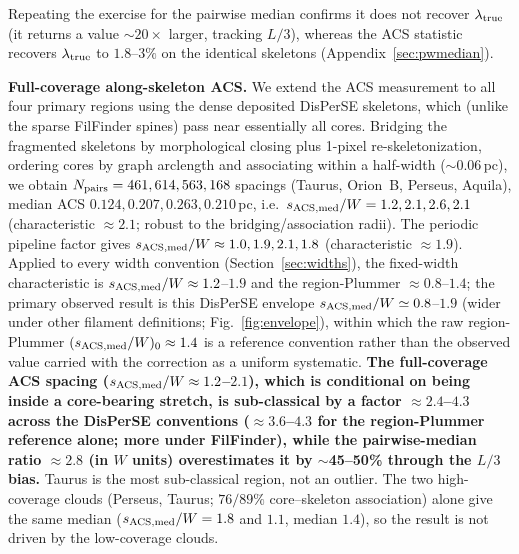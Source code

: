 \documentclass[usenatbib,twoside,twocolumn]{mnras}
\begin{document}
Repeating the exercise for the pairwise median confirms it does not recover $\lambda_{\rm true}$ (it returns a value $\sim$$20\times$ larger, tracking $L/3$), whereas the ACS statistic recovers $\lambda_{\rm true}$ to $1.8$--$3\%$ on the identical skeletons (Appendix~\ref{sec:pwmedian}).

\textbf{Full-coverage along-skeleton ACS.} We extend the ACS measurement to all four primary regions using the dense deposited DisPerSE skeletons, which (unlike the sparse FilFinder spines) pass near essentially all cores. Bridging the fragmented skeletons by morphological closing plus 1-pixel re-skeletonization, ordering cores by graph arclength and associating within a half-width ($\sim$0.06\,pc), we obtain $N_{\rm pairs}=461,614,563,168$ spacings (Taurus, Orion~B, Perseus, Aquila), median ACS $0.124,0.207,0.263,0.210$\,pc, i.e.\ $s_{\rm ACS,med}/W=1.2,2.1,2.6,2.1$ (characteristic $\approx2.1$; robust to the bridging/association radii). The periodic pipeline factor gives $s_{\rm ACS,med}/W\approx1.0,1.9,2.1,1.8$ (characteristic $\approx1.9$). Applied to every width convention (Section~\ref{sec:widths}), the fixed-width characteristic is $s_{\rm ACS,med}/W\approx1.2$--$1.9$ and the region-Plummer $\approx0.8$--$1.4$; the primary observed result is this DisPerSE envelope $s_{\rm ACS,med}/W\simeq0.8$--$1.9$ (wider under other filament definitions; Fig.~\ref{fig:envelope}), within which the raw region-Plummer $(s_{\rm ACS,med}/W)_0\approx1.4$ is a reference convention rather than the observed value carried with the correction as a uniform systematic. \textbf{The full-coverage ACS spacing ($s_{\rm ACS,med}/W\approx1.2$--$2.1$), which is conditional on being inside a core-bearing stretch, is sub-classical by a factor $\approx2.4$--$4.3$ across the DisPerSE conventions ($\approx3.6$--$4.3$ for the region-Plummer reference alone; more under FilFinder), while the pairwise-median ratio $\approx2.8$ (in $W$ units) overestimates it by $\sim$45--50\% through the $L/3$ bias.} Taurus is the most sub-classical region, not an outlier. The two high-coverage clouds (Perseus, Taurus; $76/89\%$ core--skeleton association) alone give the same median ($s_{\rm ACS,med}/W=1.8$ and $1.1$, median $1.4$), so the result is not driven by the low-coverage clouds.
\end{document}
